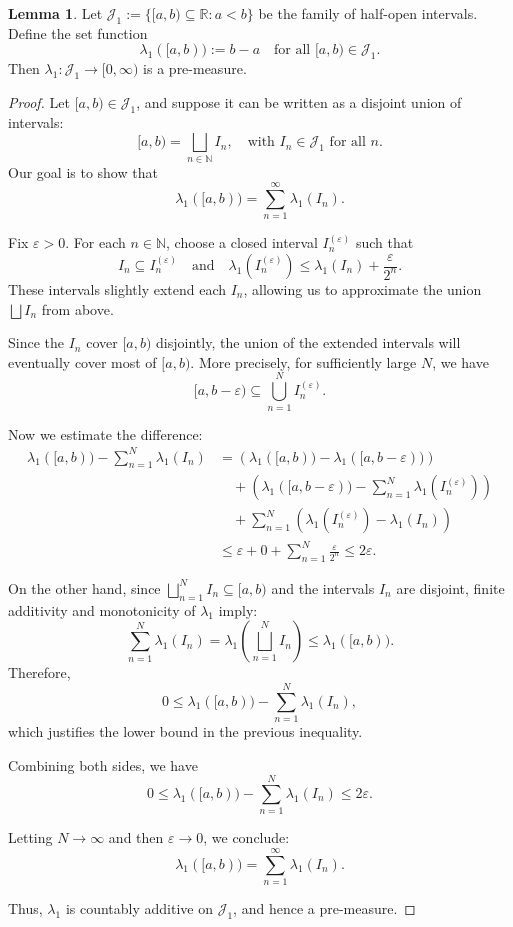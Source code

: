 \documentclass[12pt]{article}
\theoremstyle{definition}
\newtheorem{lemma}[theorem]{Lemma}
\begin{document}
\medskip
\begin{lemma}
Let $\mathcal{J}_1 := \{ [a,b) \subseteq \mathbb{R} : a < b \}$ be the family of half-open intervals. Define the set function
\[
\lambda_1([a,b)) := b - a \quad \text{for all } [a,b) \in \mathcal{J}_1.
\]
Then $\lambda_1 : \mathcal{J}_1 \to [0,\infty)$ is a pre-measure.
\end{lemma}

\begin{proof}
Let $[a,b) \in \mathcal{J}_1$, and suppose it can be written as a disjoint union of intervals:
\[
[a,b) = \bigsqcup_{n \in \mathbb{N}} I_n, \quad \text{with } I_n \in \mathcal{J}_1 \text{ for all } n.
\]
Our goal is to show that
\[
\lambda_1([a,b)) = \sum_{n=1}^\infty \lambda_1(I_n).
\]

Fix $\varepsilon > 0$. For each $n \in \mathbb{N}$, choose a closed interval $I_n^{(\varepsilon)}$ such that
\[
I_n \subseteq I_n^{(\varepsilon)} \quad \text{and} \quad \lambda_1(I_n^{(\varepsilon)}) \leq \lambda_1(I_n) + \frac{\varepsilon}{2^n}.
\]
These intervals slightly extend each $I_n$, allowing us to approximate the union $\bigsqcup I_n$ from above.

Since the $I_n$ cover $[a,b)$ disjointly, the union of the extended intervals will eventually cover most of $[a,b)$. More precisely, for sufficiently large $N$, we have
\[
[a, b - \varepsilon) \subseteq \bigcup_{n=1}^N I_n^{(\varepsilon)}.
\]

Now we estimate the difference:
\begin{align*}
\lambda_1([a,b)) - \sum_{n=1}^N \lambda_1(I_n)
&= \left( \lambda_1([a,b)) - \lambda_1([a,b - \varepsilon)) \right) \\
&\quad + \left( \lambda_1([a,b - \varepsilon)) - \sum_{n=1}^N \lambda_1(I_n^{(\varepsilon)}) \right) \\
&\quad + \sum_{n=1}^N \left( \lambda_1(I_n^{(\varepsilon)}) - \lambda_1(I_n) \right) \\
&\leq \varepsilon + 0 + \sum_{n=1}^N \frac{\varepsilon}{2^n} \leq 2\varepsilon.
\end{align*}

On the other hand, since $\bigsqcup_{n=1}^N I_n \subseteq [a,b)$ and the intervals $I_n$ are disjoint, finite additivity and monotonicity of $\lambda_1$ imply:
\[
\sum_{n=1}^N \lambda_1(I_n) = \lambda_1\left( \bigsqcup_{n=1}^N I_n \right) \leq \lambda_1([a,b)).
\]
Therefore,
\[
0 \leq \lambda_1([a,b)) - \sum_{n=1}^N \lambda_1(I_n),
\]
which justifies the lower bound in the previous inequality.

Combining both sides, we have
\[
0 \leq \lambda_1([a,b)) - \sum_{n=1}^N \lambda_1(I_n) \leq 2\varepsilon.
\]

Letting $N \to \infty$ and then $\varepsilon \to 0$, we conclude:
\[
\lambda_1([a,b)) = \sum_{n=1}^\infty \lambda_1(I_n).
\]

Thus, $\lambda_1$ is countably additive on $\mathcal{J}_1$, and hence a pre-measure.
\end{proof}
\end{document}

